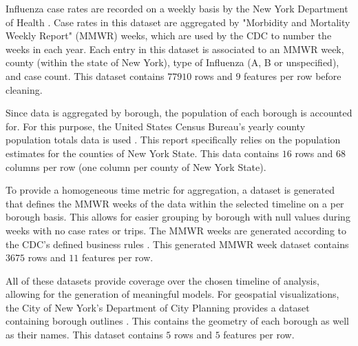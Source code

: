 \documentclass[11pt]{article}
\begin{document}
Influenza case rates are recorded on a weekly basis by the New York Department of Health \cite{fludataset}. 
Case rates in this dataset are aggregated by "Morbidity and Mortality Weekly Report" (MMWR) weeks, which are used by the CDC to number the weeks in each year\cite{mmwr}.
Each entry in this dataset is associated to an MMWR week, county (within the state of New York), type of Influenza (A, B or unspecified), and case count.
This dataset contains $77910$ rows and $9$ features per row before cleaning.

Since data is aggregated by borough, the population of each borough is accounted for.
For this purpose, the United States Census Bureau's yearly county population totals data is used \cite{populations2019, populations2020}.
This report specifically relies on the population estimates for the counties of New York State.
This data contains $16$ rows and $68$ columns per row (one column per county of New York State).

To provide a homogeneous time metric for aggregation, 
a dataset is generated that defines the MMWR weeks of the data within the selected timeline on a per borough basis.
This allows for easier grouping by borough with null values during weeks with no case rates or trips.
The MMWR weeks are generated according to the CDC's defined business rules \cite{mmwr}.
This generated MMWR week dataset contains $3675$ rows and $11$ features per row.

All of these datasets provide coverage over the chosen timeline of analysis, 
allowing for the generation of meaningful models.
For geospatial visualizations, 
the City of New York's Department of City Planning provides a dataset containing borough outlines \cite{boroughdataset}.
This contains the geometry of each borough as well as their names.
This dataset contains $5$ rows and $5$ features per row.




\end{document}
